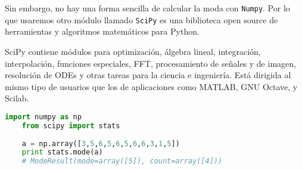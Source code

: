 Sin embargo, no hay una forma sencilla de calcular la moda con \texttt{Numpy}. Por lo que usaremos otro módulo llamado \texttt{SciPy} es una biblioteca open source de herramientas y algoritmos matemáticos para Python.

SciPy contiene módulos para optimización, álgebra lineal, integración, interpolación, funciones especiales, FFT, procesamiento de señales y de imagen, resolución de ODEs y otras tareas para la ciencia e ingeniería. Está dirigida al mismo tipo de usuarios que los de aplicaciones como MATLAB, GNU Octave, y Scilab.

\begin{lstlisting}[language=Python]
	import numpy as np
	from scipy import stats
	
	a = np.array([3,5,6,5,6,5,6,6,3,1,5])
	print stats.mode(a)
	# ModeResult(mode=array([5]), count=array([4]))
\end{lstlisting}


